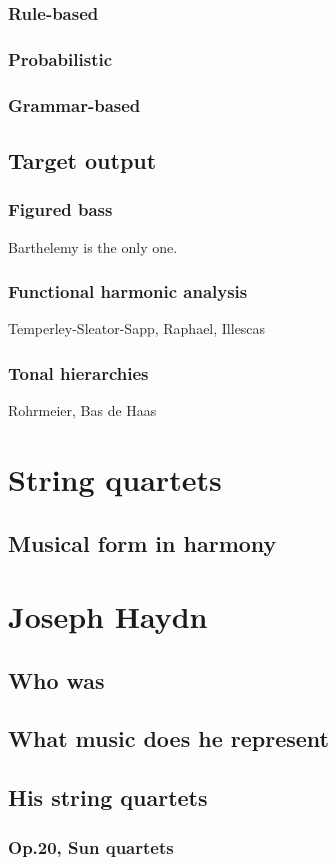     \subsubsection{Rule-based}
    \subsubsection{Probabilistic}
    \subsubsection{Grammar-based}
  \subsection{Target output}
    \subsubsection{Figured bass}
    Barthelemy is the only one.
    \subsubsection{Functional harmonic analysis}
    Temperley-Sleator-Sapp, Raphael, Illescas
    \subsubsection{Tonal hierarchies}
    Rohrmeier, Bas de Haas
\section{String quartets}
  \subsection{Musical form in harmony}
\section{Joseph Haydn}
  \subsection{Who was}
  \subsection{What music does he represent}
  \subsection{His string quartets}
    \subsubsection{Op.20, Sun quartets}

\newpage
